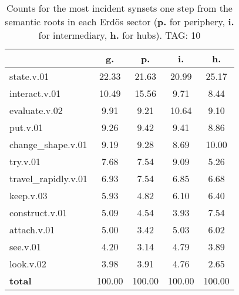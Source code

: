 \begin{table}[h!]
\begin{center}
\begin{tabular}{| l | c | c | c | c |}\hline
 & g. & p. & i. & h. \\\hline
state.v.01 & 22.33  & 21.63  & 20.99  & 25.17 \\\hline
interact.v.01 & 10.49  & 15.56  & 9.71  & 8.44 \\\hline
evaluate.v.02 & 9.91  & 9.21  & 10.64  & 9.10 \\\hline
put.v.01 & 9.26  & 9.42  & 9.41  & 8.86 \\\hline
change\_shape.v.01 & 9.19  & 9.28  & 8.69  & 10.00 \\\hline
try.v.01 & 7.68  & 7.54  & 9.09  & 5.26 \\\hline
travel\_rapidly.v.01 & 6.93  & 7.54  & 6.85  & 6.68 \\\hline
keep.v.03 & 5.93  & 4.82  & 6.10  & 6.40 \\\hline
construct.v.01 & 5.09  & 4.54  & 3.93  & 7.54 \\\hline
attach.v.01 & 5.00  & 3.42  & 5.03  & 6.02 \\\hline
see.v.01 & 4.20  & 3.14  & 4.79  & 3.89 \\\hline
look.v.02 & 3.98  & 3.91  & 4.76  & 2.65 \\\hline
{{\bf total}} & 100.00  & 100.00  & 100.00  & 100.00 \\\hline
\end{tabular}
\caption{Counts for the most incident synsets one step from the semantic roots in each Erd\"os sector ({\bf p.} for periphery, {\bf i.} for intermediary, {\bf h.} for hubs). TAG: 10}
\end{center}
\end{table}